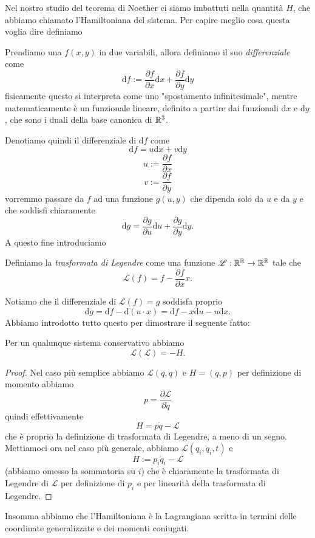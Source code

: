 \documentclass[11pt]{scrartcl}
\newcommand{\dif}{\text{d}}
\begin{document}
	Nel nostro studio del teorema di Noether ci siamo imbattuti nella quantità $H$, che abbiamo chiamato l'Hamiltoniana del sistema. Per capire meglio cosa questa voglia dire definiamo
	\begin{definition}[Differenziale]
		Prendiamo una $f(x,y)$ in due variabili, allora definiamo il suo \textit{differenziale} come
		$$\dif f:=\frac{\partial f}{\partial x}\dif x+\frac{\partial f}{\partial y}\dif y$$
		fisicamente questo si interpreta come uno "spostamento infinitesimale", mentre matematicamente è un funzionale lineare, definito a partire dai funzionali $\dif x$ e $\dif y$, che sono i duali della base canonica di $\mathbb R^3$.
	\end{definition}
	Denotiamo quindi il differenziale di $\dif f$ come
	$$\dif f=u\dif x+v\dif y$$
	$$u:=\frac{\partial f}{\partial x}$$
	$$v:=\frac{\partial f}{\partial y}$$
	vorremmo passare da $f$ ad una funzione $g(u,y)$ che dipenda solo da $u$ e da $y$ e che soddisfi chiaramente
	$$\dif g=\frac{\partial g}{\partial u}\dif u+\frac{\partial g}{\partial y}\dif y.$$
	A questo fine introduciamo
	\begin{definition}
		Definiamo la \textit{trasformata di Legendre} come una funzione $\mathscr{L}:\mathbb R^\mathbb R\to \mathbb R^\mathbb R$ tale che
		$$\mathscr{L}(f)=f-\frac{\partial f}{\partial x}x.$$ 
	\end{definition}
	Notiamo che il differenziale di $\mathscr{L}(f)=g$ soddisfa proprio
	$$\dif g=\dif f -\dif \left(u\cdot x\right)=\dif f-x\dif u-u\dif x.$$
	Abbiamo introdotto tutto questo per dimostrare il seguente fatto:
	\begin{proposition}
		Per un qualunque sistema conservativo abbiamo
		$$\mathscr{L}(\mathcal{L})=-H.$$
	\end{proposition}
	\begin{proof}
		Nel caso più semplice abbiamo $\mathcal{L}(q,\dot{q})$ e $H=(q,p)$ per definizione di momento abbiamo
		$$p=\frac{\partial \mathcal{L}}{\partial \dot{q}}$$
		quindi effettivamente 
		$$H=p\dot{q}-\mathcal{L}$$
		che è proprio la definizione di trasformata di Legendre, a meno di un segno. Mettiamoci ora nel caso più generale, abbiamo $\mathcal{L}(q_i,\dot{q}_i,t)$ e 
		$$H:=p_i \dot{q}_i-\mathcal{L}$$
		(abbiamo omesso la sommatoria su $i$) che è chiaramente la trasformata di Legendre di $\mathcal{L}$ per definizione di $p_i$ e per linearità della trasformata di Legendre.
	\end{proof}
	Insomma abbiamo che l'Hamiltoniana è la Lagrangiana scritta in termini delle coordinate generalizzate e dei momenti coniugati.
	
\end{document}
